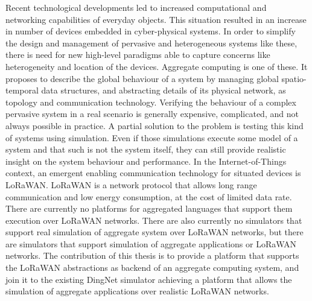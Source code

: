 Recent technological developments led to increased computational and networking capabilities of everyday objects. 
This situation resulted in an increase in number of devices embedded in cyber-physical systems.
In order to simplify the design and management of pervasive and heterogeneous systems like these, there is need for new high-level paradigms able to capture concerns like heterogeneity and location of the devices.
Aggregate computing is one of these.
It proposes to describe the global behaviour of a system by managing global spatio-temporal data structures, and abstracting details of its physical network, as topology and communication technology.
Verifying the behaviour of a complex pervasive system in a real scenario is generally expensive, complicated, and not always possible in practice.
A partial solution to the problem is testing this kind of systems using simulation.
Even if those simulations execute some model of a system and that such is not the system itself, they can still provide realistic insight on the system behaviour and performance. %
In the Internet-of-Things context, an emergent enabling communication technology for situated devices is LoRaWAN.
LoRaWAN is a network protocol that allows long range communication and low energy consumption, at the cost of limited data rate.
There are currently no platforms for aggregated languages that support them execution over LoRaWAN networks.
There are also currently no simulators that support real simulation of aggregate system over LoRaWAN networks, but there are simulators that support simulation of aggregate applications or LoRaWAN networks.
The contribution of this thesis is to provide a platform that supports the LoRaWAN abstractions as backend of an aggregate computing system, and join it to the existing DingNet simulator achieving a platform that allows the simulation of aggregate applications over realistic LoRaWAN networks. 
